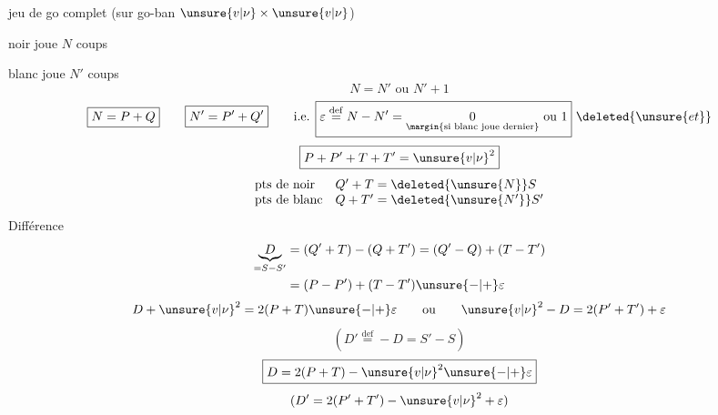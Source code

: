 jeu de go complet (sur go-ban $\unsure{v|\nu}\times\unsure{v|\nu}$)

noir joue $N$ coups

blanc joue $N'$ coups
\[
N=N'\text{ ou }N'+1
\]
\[
\boxed{N=P+Q}\qquad\boxed{N'=P'+Q'}\qquad\text{i.e. }\boxed{\varepsilon\overset{\mathrm{def}}{=}N-N'=\underset{\margin{\text{si blanc joue dernier}}}{0}\text{ ou }1}\ \deleted{\unsure{et}}
\]
\[
\boxed{P+P'+T+T'=\unsure{v|\nu}^2}
\]
\[
\begin{array}{ll}
\text{pts de noir}&Q'+T=\deleted{\unsure{N}}S\\
\text{pts de blanc}&Q+T'=\deleted{\unsure{N'}}S'
\end{array}
\]
Différence
\[
\begin{aligned}
\underbrace{D}_{=S-S'}&=(Q'+T)-(Q+T')=(Q'-Q)+(T-T')\\
&=(P-P')+(T-T')\unsure{-|+}\varepsilon
\end{aligned}
\]
\[
D+\unsure{v|\nu}^2=2(P+T)\unsure{-|+}\varepsilon
\qquad\text{ou}\qquad \unsure{v|\nu}^2-D=2(P'+T')+\varepsilon
\]
\[
(D'\overset{\mathrm{def}}{=}-D=S'-S)
\]
\[
\boxed{D=2(P+T)-\unsure{v|\nu}^2\unsure{-|+}\varepsilon}
\]
\[
(D'=2(P'+T')-\unsure{v|\nu}^2+\varepsilon)
\]
